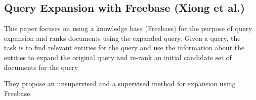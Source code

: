 \documentclass{article}
\begin{document}
\subsection{Query Expansion with Freebase (Xiong et al.\cite{xiong2015query})}
\label{subsec:query expansion with freebase}

This paper focuses on using a knowledge base (Freebase) for the purpose of query expansion and ranks documents using the expanded query. Given a query, the task is to find relevant entities for the query and use the information about the entities to expand the original query and re-rank an initial candidate set of documents for the query

They propose an unsupervised and a supervised method for expansion using Freebase. 
\end{document}
